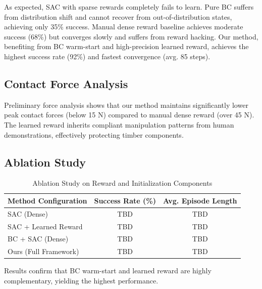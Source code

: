 \documentclass[conference]{IEEEtran}
\begin{document}
As expected, SAC with sparse rewards completely fails to learn. Pure BC suffers from distribution shift and cannot recover from out-of-distribution states, achieving only 35\% success. Manual dense reward baseline achieves moderate success (68\%) but converges slowly and suffers from reward hacking. Our method, benefiting from BC warm-start and high-precision learned reward, achieves the highest success rate (92\%) and fastest convergence (avg. 85 steps).

\subsection{Contact Force Analysis}
Preliminary force analysis shows that our method maintains significantly lower peak contact forces (below 15 N) compared to manual dense reward (over 45 N). The learned reward inherits compliant manipulation patterns from human demonstrations, effectively protecting timber components.

\subsection{Ablation Study}
\begin{table}[h]
\centering
\caption{Ablation Study on Reward and Initialization Components}
\label{tab:ablation}
\begin{tabular}{lcc}
\toprule
Method Configuration & Success Rate (\%) & Avg. Episode Length \\
\midrule
SAC (Dense) & TBD & TBD \\
SAC + Learned Reward & TBD & TBD \\
BC + SAC (Dense) & TBD & TBD \\
Ours (Full Framework) & TBD & TBD \\
\bottomrule
\end{tabular}
\end{table}

Results confirm that BC warm-start and learned reward are highly complementary, yielding the highest performance.
\end{document}
